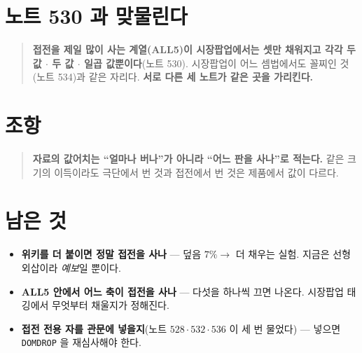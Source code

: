 \documentclass[11pt]{article}
\begin{document}
\section{노트 530 과 맞물린다}

\begin{quote}
\textbf{접전을 제일 많이 사는 계열(ALL5)이 시장팝업에서는 셋만 채워지고 각각
두 값 $\cdot$ 두 값 $\cdot$ 일곱 값뿐이다}(노트 530). 시장팝업이 어느 셈법에서도
꼴찌인 것(노트 534)과 같은 자리다. \textbf{서로 다른 세 노트가 같은 곳을
가리킨다.}
\end{quote}

\section*{조항}

\begin{quote}
\textbf{자료의 값어치는 ``얼마나 버나''가 아니라 ``어느 판을 사나''로 적는다.}
같은 크기의 이득이라도 극단에서 번 것과 접전에서 번 것은 제품에서 값이 다르다.
\end{quote}

\section*{남은 것}

\begin{itemize}
\item \textbf{위키를 더 붙이면 정말 접전을 사나} --- 덮음 $7\% \to$ 더 채우는
실험. 지금은 선형 외삽이라 \emph{예보}일 뿐이다.
\item \textbf{ALL5 안에서 어느 축이 접전을 사나} --- 다섯을 하나씩 끄면 나온다.
시장팝업 태깅에서 무엇부터 채울지가 정해진다.
\item \textbf{접전 전용 자를 관문에 넣을지}(노트 $528 \cdot 532 \cdot 536$ 이
세 번 물었다) --- 넣으면 \texttt{DOMDROP} 을 재심사해야 한다.
\end{itemize}
\end{document}
